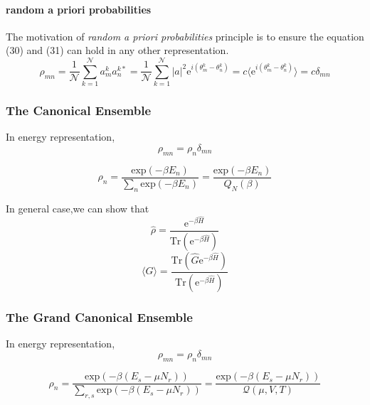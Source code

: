 \documentclass{article}
\begin{document}
\paragraph{random a priori probabilities} The motivation of \emph{random a priori probabilities} principle is to ensure the equation (30) and (31) can hold in any other representation.
\begin{equation}
\rho_{mn}=\frac{1}{\mathcal{N}} \sum_{k=1}^{\mathcal{N}} a_m^k a_n^{k*} =\frac{1}{\mathcal{N}} \sum_{k=1}^{\mathcal{N}} |a|^2 \mathrm{e}^{i(\theta_m^k -\theta_n^k)} = c \langle \mathrm{e}^{i(\theta_m^k -\theta_n^k)} \rangle = c \delta_{mn}
\end{equation}
\subsubsection{The Canonical Ensemble}
In energy representation,
\begin{equation}
\rho_{mn}=\rho_n \delta_{mn}
\end{equation}

\begin{equation}
\rho_{n} =  \frac{\mathrm{exp}(-\beta E_n)}{\sum_n \mathrm{exp}(-\beta E_n)} = \frac{\mathrm{exp}(-\beta E_n)}{Q_N(\beta)}
\end{equation}

In general case,we can show that
\begin{equation}
\widehat{\rho}= \frac{\mathrm{e}^{-\beta \widehat{H}}}{\mathrm{Tr}(\mathrm{e}^{-\beta \widehat{H}})}
\end{equation}
\begin{equation}
\langle G \rangle = \frac{\mathrm{Tr}(\widehat{G} \mathrm{e}^{-\beta \widehat{H}})}{\mathrm{Tr}(\mathrm{e}^{-\beta \widehat{H}})}
\end{equation}

\subsubsection{The Grand Canonical Ensemble}
In energy representation,
\begin{equation}
\rho_{mn}=\rho_n \delta_{mn}
\end{equation}

\begin{equation}
\rho_{n} =  \frac{\mathrm{exp}(-\beta (E_s-\mu N_r))}{\sum_{r,s} \mathrm{exp}(-\beta (E_s-\mu N_r))} = \frac{\mathrm{exp}(-\beta (E_s-\mu N_r))}{\mathcal{Q}(\mu,V,T)}
\end{equation}
\end{document}
